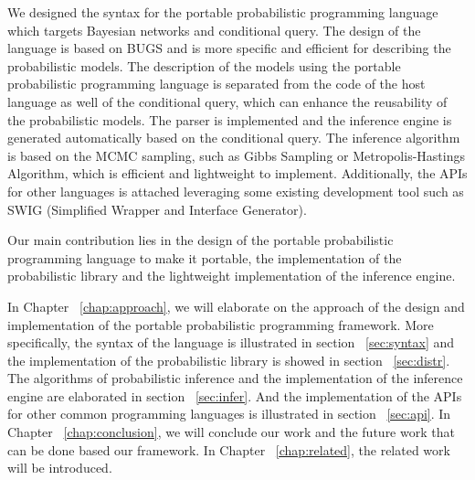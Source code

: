 We designed the syntax for the portable probabilistic programming language which targets Bayesian networks and conditional query. The design of the language is based on BUGS and is more specific and efficient for describing the probabilistic models. The description of the models using the portable probabilistic programming language is separated from the code of the host language as well of the conditional query, which can enhance the reusability of the probabilistic models. The parser is implemented and the inference engine is generated automatically based on the conditional query. The inference algorithm is based on the MCMC sampling, such as Gibbs Sampling or Metropolis-Hastings Algorithm, which is efficient and lightweight to implement. Additionally, the APIs for other languages is attached leveraging some existing development tool such as SWIG (Simplified Wrapper and Interface Generator). 

Our main contribution lies in the design of the portable probabilistic programming language to make it portable, the implementation of the probabilistic library and the lightweight implementation of the inference engine. 

In Chapter ~\ref{chap:approach}, we will elaborate on the approach of the design and implementation of the portable probabilistic programming framework. More specifically, the syntax of the language is illustrated in section ~\ref{sec:syntax} and the implementation of the probabilistic library is showed in section ~\ref{sec:distr}. The algorithms of probabilistic inference and the implementation of the inference engine are elaborated in section ~\ref{sec:infer}. And the implementation of the APIs for other common programming languages is illustrated in section ~\ref{sec:api}. In Chapter ~\ref{chap:conclusion}, we will conclude our work and the future work that can be done based our framework. In Chapter ~\ref{chap:related}, the related work will be introduced.
